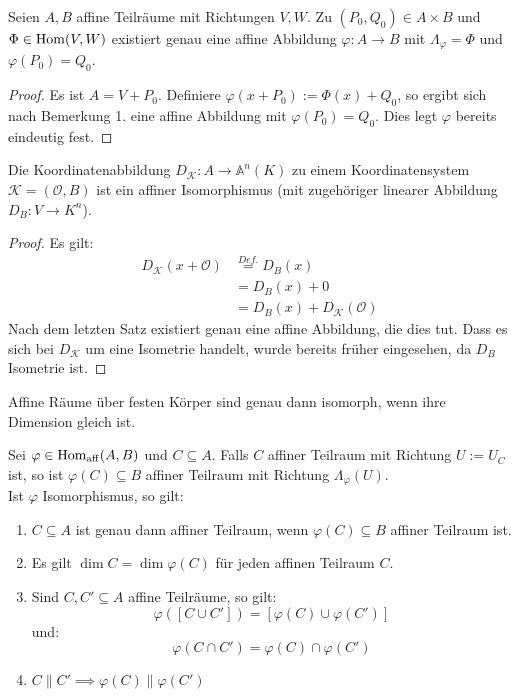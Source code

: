 \documentclass[parskip,a4paper,twoside,DIV15,BCOR12mm]{scrbook}
\begin{document}
\begin{theo}
Seien $A,B$ affine Teilräume mit Richtungen $V,W$.
Zu $(P_0,Q_0)\in A\times B$ und $\Phi\in\operatorname{Hom}(V,W)$ existiert genau eine affine Abbildung
$\varphi:A\to B$ mit $\Lambda_\varphi=\Phi$ und $\varphi(P_0)=Q_0$.
\end{theo}

\begin{proof}
Es ist $A=V+P_0$. Definiere $\varphi(x+P_0):=\Phi(x)+Q_0$, so ergibt sich nach Bemerkung 1.
eine affine Abbildung mit $\varphi(P_0)=Q_0$. Dies legt $\varphi$ bereits eindeutig fest.
\end{proof}

\begin{theo}
Die Koordinatenabbildung $D_\mathcal{K}:A\to\mathbb{A}^n(K)$ zu einem Koordinatensystem 
$\mathcal{K}=(\mathcal{O},B)$ ist ein affiner Isomorphismus (mit zugehöriger linearer Abbildung
$D_B:V\to K^n$).
\end{theo}

\begin{proof}
Es gilt:
\begin{align*}
D_\mathcal{K}(x+\mathcal{O})&\stackrel{Def.}{=} D_B(x)\\
&= D_B(x)+0\\
&= D_B(x)+D_\mathcal{K}(\mathcal{O})
\end{align*}
Nach dem letzten Satz existiert genau eine affine Abbildung, die dies tut.
Dass es sich bei $D_\mathcal{K}$ um eine Isometrie handelt, wurde bereits früher eingesehen,
da $D_B$ Isometrie ist.
\end{proof}

\begin{corollary}
Affine Räume über festen Körper sind genau dann isomorph, wenn ihre Dimension gleich ist.
\end{corollary}

\begin{theo}
Sei $\varphi\in\operatorname{Hom_{aff}}(A,B)$ und $C\subseteq A$.
Falls $C$ affiner Teilraum  mit Richtung $U:=U_C$ ist, so ist $\varphi(C)\subseteq B$
affiner Teilraum mit Richtung $\Lambda_\varphi(U)$.\\
Ist $\varphi$ Isomorphismus, so gilt:
\begin{enumerate}
\item $C\subseteq A$ ist genau dann affiner Teilraum, wenn $\varphi(C)\subseteq B$ affiner Teilraum ist.
\item Es gilt $\dim C = \dim \varphi(C)$ für jeden affinen Teilraum $C$.
\item Sind $C,C'\subseteq A$ affine Teilräume, so gilt:
\[\varphi([C\cup C'])=[\varphi(C)\cup\varphi(C')]\]
und:
\[\varphi(C\cap C')=\varphi(C)\cap\varphi(C')\]
\item $C\parallel C' \implies \varphi(C)\parallel\varphi(C')$
\end{enumerate}
\end{theo}
\end{document}
